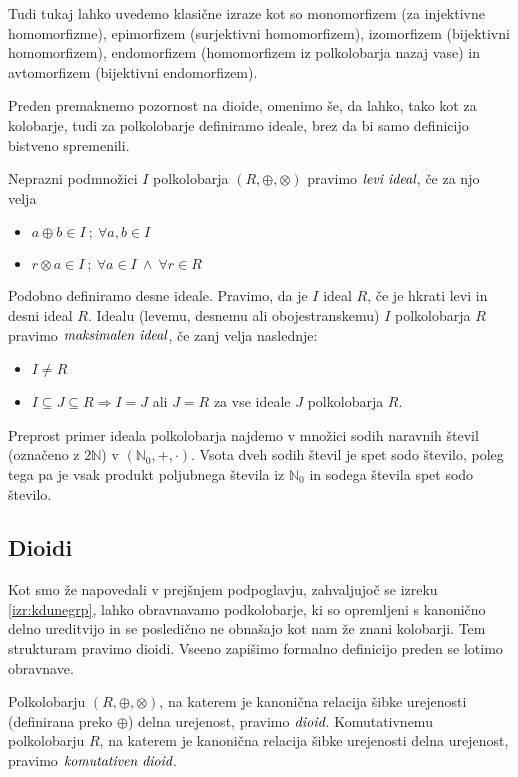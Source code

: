 \documentclass[mat1]{fmfdelo}
\newcommand{\N}{\mathbb{N}}
\newcommand{\No}{\N_0}
\newcommand{\pojem}[1]{\ensuremath{\emph{#1}}}
\begin{document}
Tudi tukaj lahko uvedemo klasične izraze kot so monomorfizem (za injektivne homomorfizme), epimorfizem (surjektivni homomorfizem), izomorfizem (bijektivni homomorfizem), endomorfizem (homomorfizem iz polkolobarja nazaj vase) in avtomorfizem (bijektivni endomorfizem).

Preden premaknemo pozornost na dioide, omenimo še, da lahko, tako kot za kolobarje, tudi za polkolobarje definiramo ideale, brez da bi samo definicijo bistveno spremenili.

\begin{definicija}
	Neprazni podmnožici $I$ polkolobarja $(R, \oplus, \otimes)$ pravimo \pojem{levi ideal}, če za njo velja \begin{itemize}
		\item $a \oplus b \in I~;~\forall a, b\in I$
		\item $r\otimes a \in I~;~\forall a\in I~\land~\forall r\in R$ 
	\end{itemize}
	Podobno definiramo desne ideale. Pravimo, da je $I$ ideal $R$, če je hkrati levi in desni ideal $R$.
	Idealu (levemu, desnemu ali obojestranskemu) $I$ polkolobarja $R$ pravimo \pojem{maksimalen ideal}, če zanj velja naslednje: \begin{itemize}
		\item $I \neq R$
		\item $I \subseteq J \subseteq R \Rightarrow I = J$ ali $J = R$ za vse ideale $J$ polkolobarja $R$.
	\end{itemize}
\end{definicija}
Preprost primer ideala polkolobarja najdemo v množici sodih naravnih števil (označeno z $2\N$) v $(\No, +, \cdot)$. Vsota dveh sodih števil je spet sodo število, poleg tega pa je vsak produkt poljubnega števila iz $\No$ in sodega števila spet sodo število.
\subsection{Dioidi}\label{subsect:dioid}
Kot smo že napovedali v prejšnjem podpoglavju, zahvaljujoč se izreku \ref{izr:kdunegrp}, lahko obravnavamo podkolobarje, ki so opremljeni s kanonično delno ureditvijo in se posledično ne obnašajo kot nam že znani kolobarji. Tem strukturam pravimo dioidi. Vseeno zapišimo formalno definicijo preden se lotimo obravnave.
\begin{definicija}
	Polkolobarju $(R, \oplus, \otimes)$, na katerem je kanonična relacija šibke urejenosti (definirana preko $\oplus$) delna urejenost, pravimo \pojem{dioid}. Komutativnemu polkolobarju $R$, na katerem je kanonična relacija šibke urejenosti delna urejenost, pravimo \pojem{komutativen dioid}.
\end{definicija}
	
\end{document}
